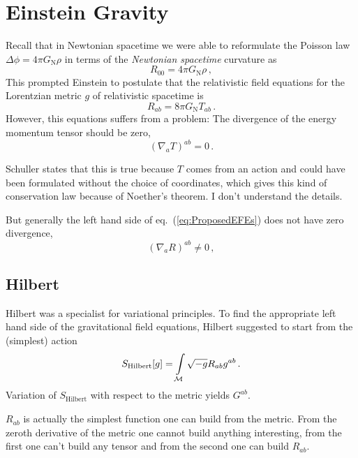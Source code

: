 \section{Einstein Gravity}
Recall that in Newtonian spacetime we were able to reformulate the Poisson law
$\Delta \phi = 4 \pi G_\text{N} \rho$
in terms of the \textit{Newtonian spacetime} curvature as
\begin{equation*}
    R_{00} = 4 \pi G_\text{N} \rho\,,
\end{equation*}
This prompted Einstein to postulate that the relativistic field 
equations for the Lorentzian metric $g$ of relativistic spacetime
is 
\begin{equation*}
    R_{ab} = 8 \pi G_\text{N} T_{ab}\,.
    \label{eq:ProposedEFEs}
\end{equation*}
However, this equations suffers from a problem:
The divergence of the energy momentum tensor should be zero,
\begin{equation*}
    (\nabla_a T)^{ab} = 0\,.
\end{equation*}
\begin{note}
    Schuller states that this is true because $T$ comes from an action and
    could have been formulated without the choice of coordinates,
    which gives this kind of conservation law because of Noether's theorem.
    I don't understand the details.
\end{note}
But generally the left hand side of eq.~(\ref{eq:ProposedEFEs}) does not have
zero divergence,
\begin{equation*}
    (\nabla_a R)^{ab} \neq 0\,,
\end{equation*}
\subsection{Hilbert}
Hilbert was a specialist for variational principles.
To find the appropriate left hand side of the gravitational field equations,
Hilbert suggested to start from the (simplest) action
\begin{equation}
    S_\text{Hilbert}[g] = \int\limits_{\mathcal{M}} \sqrt{-g} R_{ab}g^{ab}\,.
\end{equation}
Variation of $S_\text{Hilbert}$ with respect to the metric yields $G^{ab}$.
\begin{note}
    $R_{ab}$ is actually the simplest function one can build from the
    metric. From the zeroth derivative of the metric one cannot build anything
    interesting, from the first one can't build any tensor and from the second
    one can build $R_{ab}$.
\end{note}


